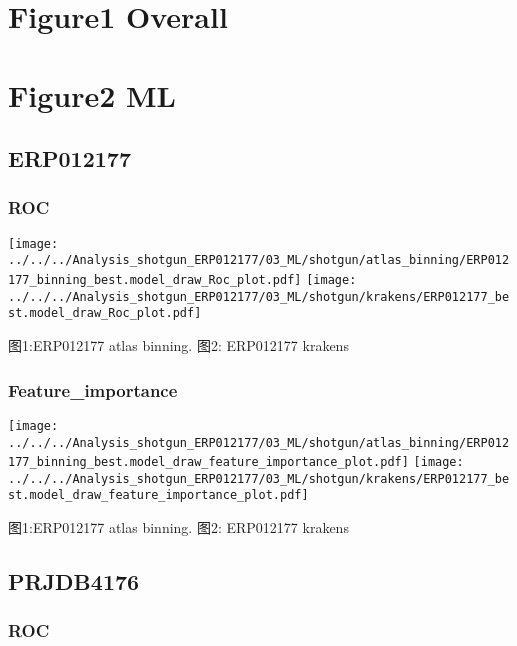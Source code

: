\documentclass[
]{article}
\author{YNYK}
\date{2023-09-27}
\begin{document}
\hypertarget{figure1-overall}{%
\section{Figure1 Overall}\label{figure1-overall}}

\hypertarget{figure2-ml}{%
\section{Figure2 ML}\label{figure2-ml}}

\hypertarget{erp012177}{%
\subsection{ERP012177}\label{erp012177}}

\hypertarget{roc}{%
\subsubsection{ROC}\label{roc}}

\texttt{[image: ../../../Analysis\_shotgun\_ERP012177/03\_ML/shotgun/atlas\_binning/ERP012177\_binning\_best.model\_draw\_Roc\_plot.pdf]}
\texttt{[image: ../../../Analysis\_shotgun\_ERP012177/03\_ML/shotgun/krakens/ERP012177\_best.model\_draw\_Roc\_plot.pdf]}

图1:ERP012177 atlas binning. 图2: ERP012177 krakens

\hypertarget{feature_importance}{%
\subsubsection{Feature\_importance}\label{feature_importance}}

\texttt{[image: ../../../Analysis\_shotgun\_ERP012177/03\_ML/shotgun/atlas\_binning/ERP012177\_binning\_best.model\_draw\_feature\_importance\_plot.pdf]}
\texttt{[image: ../../../Analysis\_shotgun\_ERP012177/03\_ML/shotgun/krakens/ERP012177\_best.model\_draw\_feature\_importance\_plot.pdf]}

图1:ERP012177 atlas binning. 图2: ERP012177 krakens

\hypertarget{prjdb4176}{%
\subsection{PRJDB4176}\label{prjdb4176}}

\hypertarget{roc-1}{%
\subsubsection{ROC}\label{roc-1}}
\end{document}
